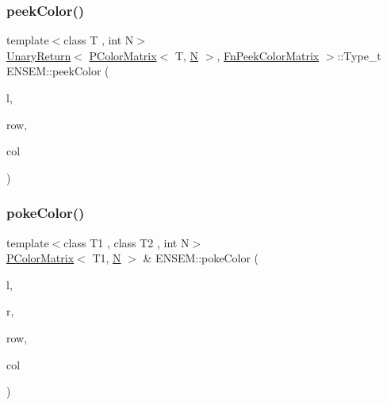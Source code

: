 \subsubsection{\texorpdfstring{peekColor()}{peekColor()}}
{\footnotesize\ttfamily template$<$class T , int N$>$ \\
\mbox{\hyperlink{structENSEM_1_1UnaryReturn}{Unary\+Return}}$<$ \mbox{\hyperlink{classENSEM_1_1PColorMatrix}{P\+Color\+Matrix}}$<$ T, \mbox{\hyperlink{operator__name__util_8cc_a7722c8ecbb62d99aee7ce68b1752f337}{N}} $>$, \mbox{\hyperlink{structENSEM_1_1FnPeekColorMatrix}{Fn\+Peek\+Color\+Matrix}} $>$\+::Type\+\_\+t E\+N\+S\+E\+M\+::peek\+Color (\begin{DoxyParamCaption}\item[{const \mbox{\hyperlink{classENSEM_1_1PColorMatrix}{P\+Color\+Matrix}}$<$ T, \mbox{\hyperlink{operator__name__util_8cc_a7722c8ecbb62d99aee7ce68b1752f337}{N}} $>$ \&}]{l,  }\item[{int}]{row,  }\item[{int}]{col }\end{DoxyParamCaption})\hspace{0.3cm}{\ttfamily [inline]}}

\mbox{\label{group__primcolormatrix_ga83e068e757a42e9866992b38a003d7f9}} 
\subsubsection{\texorpdfstring{pokeColor()}{pokeColor()}}
{\footnotesize\ttfamily template$<$class T1 , class T2 , int N$>$ \\
\mbox{\hyperlink{classENSEM_1_1PColorMatrix}{P\+Color\+Matrix}}$<$ T1, \mbox{\hyperlink{operator__name__util_8cc_a7722c8ecbb62d99aee7ce68b1752f337}{N}} $>$ \& E\+N\+S\+E\+M\+::poke\+Color (\begin{DoxyParamCaption}\item[{\mbox{\hyperlink{classENSEM_1_1PColorMatrix}{P\+Color\+Matrix}}$<$ T1, \mbox{\hyperlink{operator__name__util_8cc_a7722c8ecbb62d99aee7ce68b1752f337}{N}} $>$ \&}]{l,  }\item[{const \mbox{\hyperlink{classENSEM_1_1PScalar}{P\+Scalar}}$<$ T2 $>$ \&}]{r,  }\item[{int}]{row,  }\item[{int}]{col }\end{DoxyParamCaption})\hspace{0.3cm}{\ttfamily [inline]}}



